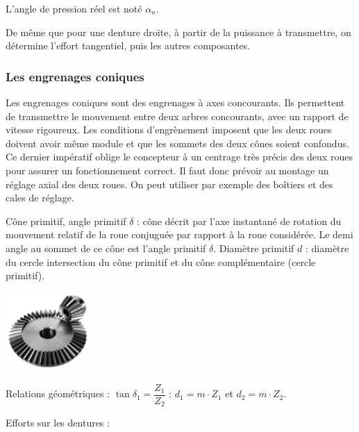 \documentclass[11pt,oneside]{article}
\begin{document}
L’angle de pression réel est noté $\alpha_n$.

De même que pour une denture droite, à partir de la puissance à transmettre, on détermine l’effort tangentiel, puis les autres composantes.

\subsubsection{Les engrenages coniques}
Les engrenages coniques sont des engrenages à axes concourants. Ils permettent de transmettre le mouvement entre deux arbres concourants, avec un rapport de vitesse rigoureux. Les conditions d’engrènement imposent que les deux roues doivent avoir même module et que les sommets des deux cônes soient confondus. Ce dernier impératif oblige le concepteur à un centrage très précis des deux roues pour assurer un fonctionnement correct. Il faut donc prévoir au montage un réglage axial des deux roues. On peut utiliser par exemple des boîtiers et des cales de réglage.

Cône primitif, angle primitif $\delta$ : cône décrit par l’axe instantané de rotation du mouvement relatif de la roue conjuguée par rapport à la roue considérée. Le demi angle au sommet de ce cône est l’angle primitif $\delta$.
Diamètre primitif $d$ : diamètre du cercle intersection du cône primitif et du cône complémentaire (cercle primitif).

\begin{center}
\includegraphics[height=3cm]{png/fig_71}
\end{center}

Relations géométriques : $\tan \delta_1 = \dfrac{Z_1}{Z_2}$ : $d_1 = m\cdot Z_1$ et $d_2 = m\cdot Z_2$.

Efforts sur les dentures : 
\end{document}
